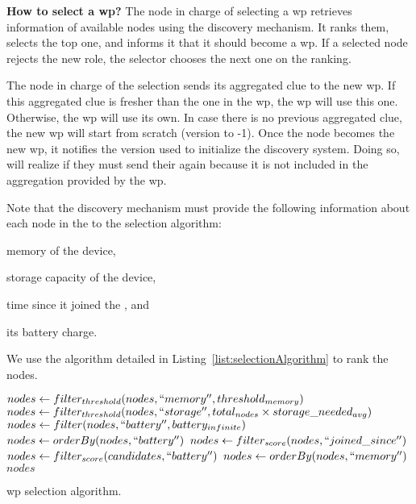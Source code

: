 \noindent\textbf{How to select a \acs{wp}?}
The node in charge of selecting a \ac{wp} retrieves information of available nodes using the discovery mechanism.
It ranks them, selects the top one, and informs it that it should become a \ac{wp}.
If a selected node rejects the new role, the selector chooses the next one on the ranking.

The node in charge of the selection sends its aggregated clue to the new \ac{wp}.
If this aggregated clue is fresher than the one in the \ac{wp}, the \ac{wp} will use this one.
Otherwise, the \ac{wp} will use its own.
In case there is no previous aggregated clue, the new \ac{wp} will start from scratch (version to -1).
Once the node becomes the new \ac{wp}, it notifies the version used to initialize the discovery system.
Doing so, \providers{} will realize if they must send their \clue{} again because it is not included in the aggregation provided by the \ac{wp}.

Note that the discovery mechanism must provide the following information about each node in the \Space{} to the selection algorithm:
\begin{enumerate*}[label=\itshape(\arabic*\upshape)]
  \item memory of the device,
  \item storage capacity of the device,
  \item time since it joined the \Space{}, and %
  \item its battery charge.
\end{enumerate*}
We use the algorithm detailed in Listing~\ref{list:selectionAlgorithm} to rank the nodes.

\begin{listing}
  \begin{algorithmic}[1]
  \State $nodes \gets filter_{threshold}(nodes, ``memory'', threshold_{memory})$
  \State $nodes \gets filter_{threshold}(nodes, ``storage'', total_{nodes} \times storage\_needed_{avg})$
    \State $nodes \gets filter(nodes, ``battery'', battery_{infinite})$
    \State $nodes \gets orderBy(nodes, ``battery'')$
  \Else
      \State $nodes \gets filter_{score}(nodes, ``joined\_since'')$
    \EndIf
    \State $nodes \gets filter_{score}(candidates, ``battery'')$
    \State $nodes \gets orderBy(nodes, ``memory'')$
  \EndIf
  \State \Return $nodes$
  \end{algorithmic}
  \caption{\acl{wp} selection algorithm.}
  \label{list:selectionAlgorithm}
\end{listing}

